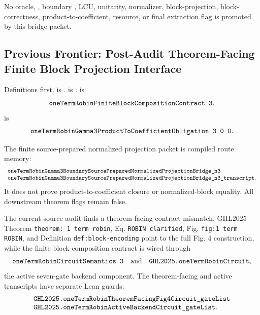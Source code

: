 No oracle, , boundary , LCU, unitarity, normalizer,
block-projection, block-correctness, product-to-coefficient, resource, or final
extraction flag is promoted by this bridge packet.

\subsection{Previous Frontier: Post-Audit Theorem-Facing Finite Block Projection Interface}

Definitions first.   is
.
 is .
 is
\[
  \Lean{oneTermRobinFiniteBlockCompositionContract\ 3}.
\]
 is
\[
  \Lean{oneTermRobinGamma3ProductToCoefficientObligation\ 3\ 0\ 0}.
\]

The finite source-prepared normalized projection packet is compiled route
memory:
\[
\begin{array}{l}
\texttt{oneTermRobinGamma3BoundarySourcePreparedNormalizedProjectionBridge\_n3}\\
\texttt{oneTermRobinGamma3BoundarySourcePreparedNormalizedProjectionBridge\_n3\_transcript}.
\end{array}
\]
It does not prove product-to-coefficient closure or normalized-block equality.
All downstream theorem flags remain false.

The current source audit finds a theorem-facing contract mismatch.  GHL2025
Theorem \texttt{theorem: 1 term robin}, Eq. \texttt{ROBIN clarified}, Fig.
\texttt{fig:1 term ROBIN}, and Definition \texttt{def:block-encoding} point to
the full Fig. 4 construction, while the finite block-composition contract is
wired through
\[
  \Lean{oneTermRobinCircuitSemantics\ 3}
  \quad\text{and}\quad
  \Lean{GHL2025.oneTermRobinCircuit},
\]
the active seven-gate backend component.  The theorem-facing and active
transcripts have separate Lean guards:
\[
\begin{array}{l}
\texttt{GHL2025.oneTermRobinTheoremFacingFig4Circuit\_gateList}\\
\texttt{GHL2025.oneTermRobinActiveBackendCircuit\_gateList}.
\end{array}
\]

